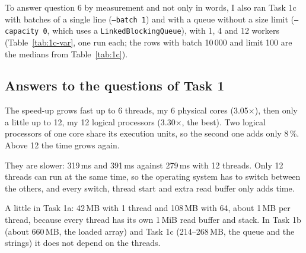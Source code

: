 \begin{table}[H]
\centering\small

\caption{Task 1c: how the queue was used (the file gives 5\,000 batches; waits are medians of 5 runs,
the queue length is the largest over the runs)}
\label{tab:1c-waits}
\end{table}

To answer question 6 by measurement and not only in words, I also ran Task 1c with batches of a
single line (\texttt{--batch 1}) and with a queue without a size limit (\texttt{--capacity 0}, which
uses a \texttt{LinkedBlockingQueue}), with 1, 4 and 12 workers (Table~\ref{tab:1c-var}, one run each;
the rows with batch 10\,000 and limit 100 are the medians from Table~\ref{tab:1c}).

\begin{table}[H]
\centering\footnotesize\setlength{\tabcolsep}{4pt}

\caption{Task 1c with other batch sizes and queue limits}
\label{tab:1c-var}
\end{table}

\subsection{Answers to the questions of Task 1}

The speed-up grows fast up to 6 threads, my 6 physical cores (3.05$\times$), then only a little up
to 12, my 12 logical processors (3.30$\times$, the best). Two logical processors of one core share
its execution units, so the second one adds only 8\,\%. Above 12 the time grows again.

They are slower: 319\,ms and 391\,ms against 279\,ms with 12 threads. Only 12 threads can run at
the same time, so the operating system has to switch between the others, and every switch, thread
start and extra read buffer only adds time.

A little in Task 1a: 42\,MB with 1 thread and 108\,MB with 64, about 1\,MB per thread, because every
thread has its own 1\,MiB read buffer and stack. In Task 1b (about 660\,MB, the loaded array) and
Task 1c (214--268\,MB, the queue and the strings) it does not depend on the threads.

